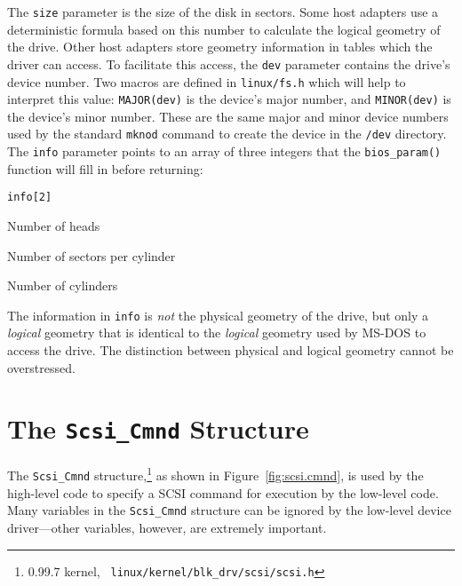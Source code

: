 The \verb|size| parameter is the size of the disk in sectors.  Some host
adapters use a deterministic formula based on this number to calculate the
logical geometry of the drive.  Other host adapters store geometry
information in tables which the driver can access.  To facilitate this
access, the \verb|dev| parameter contains the drive's device number.  Two
macros are defined in \verb|linux/fs.h| which will help to interpret this
value: \verb|MAJOR(dev)| is the device's major number, and
\verb|MINOR(dev)| is the device's minor number.  These are the same major
and minor device numbers used by the standard \Linux{} {\tt mknod} command
to create the device in the {\tt /dev} directory.  The \verb|info|
parameter points to an array of three integers that the \verb|bios_param()|
function will fill in before returning:
\begin{singlespace}
  \begin{center}
    \begin{desc}{{\tt info[2]}}
    \item[{\tt info[0]}] Number of heads
    \item[{\tt info[1]}] Number of sectors per cylinder
    \item[{\tt info[2]}] Number of cylinders
    \end{desc}
  \end{center}
\end{singlespace}

The information in \verb|info| is {\em not\/} the physical geometry of the
drive, but only a {\em logical\/} geometry that is identical to the {\em
  logical\/} geometry used by MS-DOS to access the drive.  The distinction
between physical and logical geometry cannot be overstressed.




\section{The {\tt Scsi\_Cmnd} Structure}
\label{sec:scsi.cmnd}

The \verb|Scsi_Cmnd| structure,\footnote{\Linux{} 0.99.7 kernel, {\tt
    linux/kernel/blk\_drv/scsi/scsi.h}} as shown in
Figure~\ref{fig:scsi.cmnd}, is used by the high-level code to specify a
SCSI command for execution by the low-level code.  Many variables in the
\verb|Scsi_Cmnd| structure can be ignored by the low-level device
driver---other variables, however, are extremely important.


